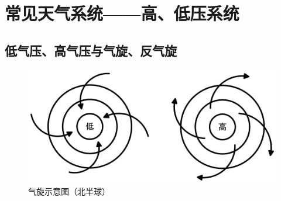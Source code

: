 \documentclass[UTF8]{ctexart}
\begin{document}
    \newpage

    \section*{常见天气系统——高、低压系统}

    \subsection*{低气压、高气压与气旋、反气旋}

    \begin{figure}[h]
        \centering
        \includegraphics[width=12cm]{img/1-3.png}
        \caption{气旋示意图（北半球）}
    \end{figure}
\end{document}
